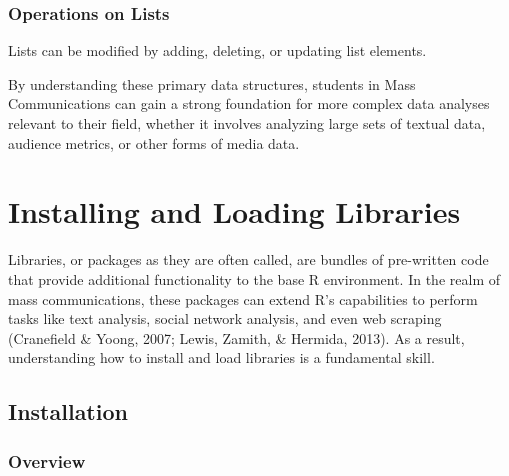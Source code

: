 \documentclass[
  b5paper]{book}
\newenvironment{Shaded}{\begin{snugshade}}{\end{snugshade}}
\newcommand{\CommentTok}[1]{\textcolor[rgb]{0.56,0.35,0.01}{\textit{#1}}}
\newcommand{\NormalTok}[1]{#1}
\newcommand{\OtherTok}[1]{\textcolor[rgb]{0.56,0.35,0.01}{#1}}
\newcommand{\SpecialCharTok}[1]{\textcolor[rgb]{0.81,0.36,0.00}{\textbf{#1}}}
\newcommand{\StringTok}[1]{\textcolor[rgb]{0.31,0.60,0.02}{#1}}
\begin{document}
\hypertarget{operations-on-lists}{%
\subsubsection*{Operations on Lists}\label{operations-on-lists}}

Lists can be modified by adding, deleting, or updating list elements.

\begin{Shaded}
\end{Shaded}

By understanding these primary data structures, students in Mass Communications can gain a strong foundation for more complex data analyses relevant to their field, whether it involves analyzing large sets of textual data, audience metrics, or other forms of media data.

\hypertarget{installing-and-loading-libraries}{%
\section{Installing and Loading Libraries}\label{installing-and-loading-libraries}}

Libraries, or packages as they are often called, are bundles of pre-written code that provide additional functionality to the base R environment. In the realm of mass communications, these packages can extend R's capabilities to perform tasks like text analysis, social network analysis, and even web scraping (Cranefield \& Yoong, 2007; Lewis, Zamith, \& Hermida, 2013). As a result, understanding how to install and load libraries is a fundamental skill.

\hypertarget{installation}{%
\subsection*{Installation}\label{installation}}

\hypertarget{overview-6}{%
\subsubsection*{Overview}\label{overview-6}}
\end{document}
